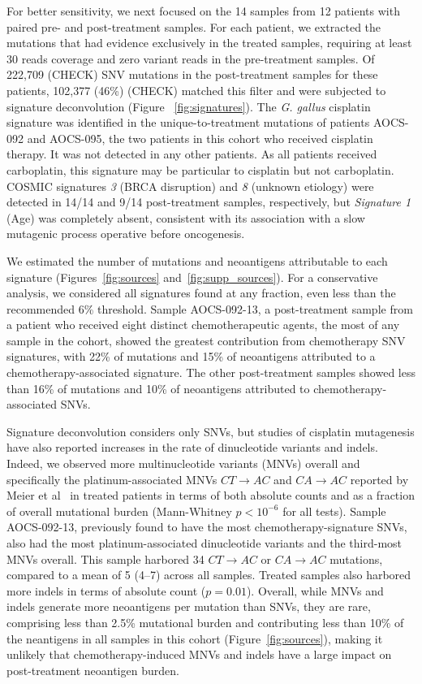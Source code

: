 For better sensitivity, we next focused on the 14 samples from 12 patients with paired pre- and post-treatment samples. For each patient, we extracted the mutations that had evidence exclusively in the treated samples, requiring at least 30 reads coverage and zero variant reads in the pre-treatment samples. Of 222,709 (CHECK) SNV mutations in the post-treatment samples for these patients, 102,377 (46\%) (CHECK) matched this filter and were subjected to signature deconvolution (Figure ~\ref{fig:signatures}). The \textit{G. gallus} cisplatin signature was identified in the unique-to-treatment mutations of patients AOCS-092 and AOCS-095, the two patients in this cohort who received cisplatin therapy. It was not detected in any other patients. As all patients received carboplatin, this signature may be particular to cisplatin but not carboplatin. COSMIC signatures \textit{3} (BRCA disruption) and \textit{8} (unknown etiology) were detected in 14/14 and 9/14 post-treatment samples, respectively, but \textit{Signature 1} (Age) was completely absent, consistent with its association with a slow mutagenic process operative before oncogenesis.

We estimated the number of mutations and neoantigens attributable to each signature (Figures~\ref{fig:sources} and~\ref{fig:supp_sources}). For a conservative analysis, we considered all signatures found at any fraction, even less than the recommended 6\% threshold. Sample AOCS-092-13, a post-treatment sample from a patient who received eight distinct chemotherapeutic agents, the most of any sample in the cohort, showed the greatest contribution from chemotherapy SNV signatures, with 22\% of mutations and 15\% of neoantigens attributed to a chemotherapy-associated signature. The other post-treatment samples showed less than 16\% of mutations and 10\% of neoantigens attributed to chemotherapy-associated SNVs.

Signature deconvolution considers only SNVs, but studies of cisplatin mutagenesis have also reported increases in the rate of dinucleotide variants and indels. Indeed, we observed more multinucleotide variants (MNVs) overall and specifically the platinum-associated MNVs $CT \rightarrow AC$ and $CA \rightarrow AC$ reported by Meier et al~\cite{Meier_2014} in treated patients in terms of both absolute counts and as a fraction of overall mutational burden (Mann-Whitney $p < 10^{-6}$ for all tests). Sample AOCS-092-13, previously found to have the most chemotherapy-signature SNVs, also had the most platinum-associated dinucleotide variants and the third-most MNVs overall. This sample harbored 34 $CT \rightarrow AC$ or $CA \rightarrow AC$ mutations, compared to a mean of 5 (4--7) across all samples. Treated samples also harbored more indels in terms of absolute count ($p=0.01$). Overall, while MNVs and indels generate more neoantigens per mutation than SNVs, they are rare, comprising less than 2.5\% mutational burden and contributing less than 10\% of the neantigens in all samples in this cohort (Figure~\ref{fig:sources}), making it unlikely that chemotherapy-induced MNVs and indels have a large impact on post-treatment neoantigen burden.

